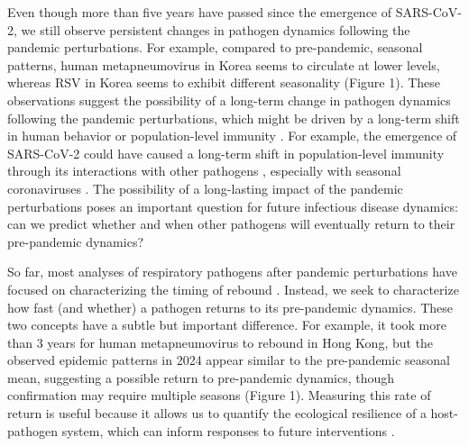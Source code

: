 \documentclass[12pt]{article}
\begin{document}
Even though more than five years have passed since the emergence of SARS-CoV-2, we still observe persistent changes in pathogen dynamics following the pandemic perturbations.
For example, compared to pre-pandemic, seasonal patterns, human metapneumovirus in Korea seems to circulate at lower levels, whereas RSV in Korea seems to exhibit different seasonality (Figure 1).
These observations suggest the possibility of a long-term change in pathogen dynamics following the pandemic perturbations, which might be driven by a long-term shift in human behavior or population-level immunity \citep{kissler2020projecting,baker2022long}.
For example, the emergence of SARS-CoV-2 could have caused a long-term shift in population-level immunity through its interactions with other pathogens \citep{swets2022sars}, especially with seasonal coronaviruses \citep{kissler2020projecting,lin2022pre,murray2023impact}.
The possibility of a long-lasting impact of the pandemic perturbations poses an important question for future infectious disease dynamics: can we predict whether and when other pathogens will eventually return to their pre-pandemic dynamics?

So far, most analyses of respiratory pathogens after pandemic perturbations have focused on characterizing the timing of rebound \citep{baker2020impact,eden2022off,perofsky2024impacts}.
Instead, we seek to characterize how fast (and whether) a pathogen returns to its pre-pandemic dynamics.
These two concepts have a subtle but important difference. 
For example, it took more than 3 years for human metapneumovirus to rebound in Hong Kong, but the observed epidemic patterns in 2024 appear similar to the pre-pandemic seasonal mean, suggesting a possible return to pre-pandemic dynamics, though confirmation may require multiple seasons (Figure 1).
Measuring this rate of return is useful because it allows us to quantify the ecological resilience of a host-pathogen system, which can inform responses to future interventions \citep{pimm1979structure, neubert1997alternatives,gunderson2000ecological,dakos2022ecological}.
\end{document}
